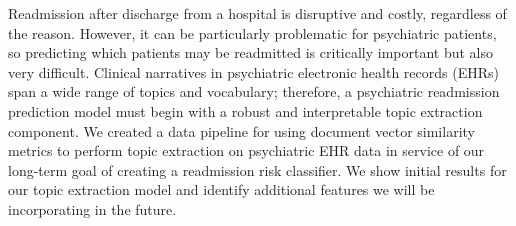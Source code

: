 Readmission after discharge from a hospital is disruptive and costly, regardless of the reason. However, it can be particularly problematic for psychiatric patients, so predicting which patients may be readmitted is critically important but also very difficult. Clinical narratives in psychiatric electronic health records (EHRs) span a wide range of topics and vocabulary; therefore, a psychiatric readmission prediction model must begin with a robust and interpretable topic extraction component. We created a data pipeline for using document vector similarity metrics to perform topic extraction on psychiatric EHR data in service of our long-term goal of creating a readmission risk classifier. We show initial results for our topic extraction model and identify additional features we will be incorporating in the future.
